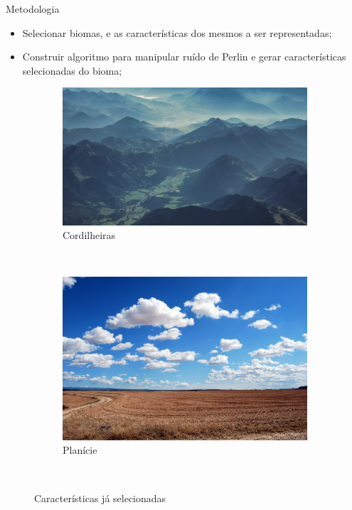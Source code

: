 \begin{frame}{Metodologia}
    \begin{itemize}
        \item Selecionar biomas, e as características dos mesmos a ser representadas;
        \item Construir algoritmo para manipular ruído de Perlin e gerar características
            selecionadas do bioma;
    \end{itemize}
    \begin{figure}
        \centering
        \begin{subfigure}[b]{0.47\textwidth}
            \includegraphics[width=\textwidth]{img/mountains}
            \caption{Cordilheiras}
            \label{fig:mountains}
        \end{subfigure}
        ~ %
        \begin{subfigure}[b]{0.47\textwidth}
            \includegraphics[width=\textwidth]{img/plains}
            \caption{Planície}
            \label{fig:plains}
        \end{subfigure}
        ~ %
        \caption{Características já selecionadas}
        \label{fig:carct}
    \end{figure}
    
\end{frame}

